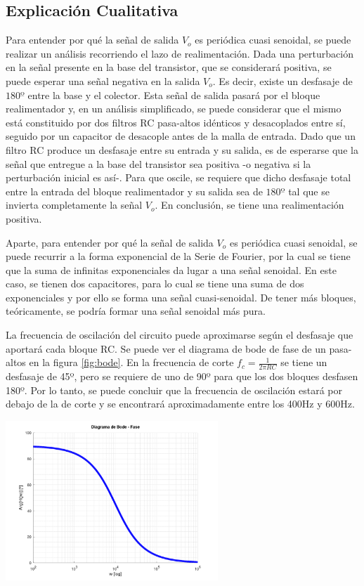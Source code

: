 \documentclass[a4paper, 10pt, spanish]{article}
\begin{document}
        \subsection{Explicación Cualitativa}
        Para entender por qué la señal de salida $V_o$ es periódica cuasi senoidal, se puede realizar un análisis recorriendo el lazo de realimentación. Dada una perturbación en la señal presente en la base del transistor, que se considerará positiva, se puede esperar una señal negativa en la salida $V_o$. Es decir, existe un desfasaje de $180º$ entre la base y el colector. Esta señal de salida pasará por el bloque realimentador y, en un análisis simplificado, se puede considerar que el mismo está constituido por dos filtros RC pasa-altos idénticos y desacoplados entre sí, seguido por un capacitor de desacople antes de la malla de entrada. Dado que un filtro RC produce un desfasaje entre su entrada y su salida, es de esperarse que la señal que entregue a la base del transistor sea positiva -o negativa si la perturbación inicial es así-. Para que oscile, se requiere que dicho desfasaje total entre la entrada del bloque realimentador y su salida sea de $180º$ tal que se invierta completamente la señal $V_o$. En conclusión, se tiene una realimentación positiva.

        Aparte, para entender por qué la señal de salida $V_o$ es periódica cuasi senoidal, se puede recurrir a la forma exponencial de la Serie de Fourier, por la cual se tiene que la suma de infinitas exponenciales da lugar a una señal senoidal. En este caso, se tienen dos capacitores, para lo cual se tiene una suma de dos exponenciales y por ello se forma una señal cuasi-senoidal. De tener más bloques, teóricamente, se podría formar una señal senoidal más pura.

        La frecuencia de oscilación del circuito puede aproximarse según el desfasaje que aportará cada bloque RC. Se puede ver el diagrama de bode de fase de un pasa-altos en la figura \ref{fig:bode}. En la frecuencia de corte $f_c=\frac{1}{2\pi R C}$ se tiene un desfasaje de 45º, pero se requiere de uno de 90º para que los dos bloques desfasen 180º. Por lo tanto, se puede concluir que la frecuencia de oscilación estará por debajo de la de corte y se encontrará aproximadamente entre los 400Hz y 600Hz.

        \begin{center}
          \includegraphics[width=0.6\textwidth]{bode-fase.png}
          \label{fig:bode}
        \end{center}
\end{document}

